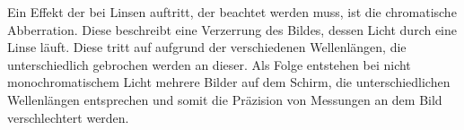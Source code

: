     \noindent Ein Effekt der bei Linsen auftritt, der beachtet werden muss, ist die chromatische Abberration. Diese beschreibt eine Verzerrung des Bildes, dessen Licht durch eine Linse läuft. Diese tritt auf aufgrund der verschiedenen Wellenlängen, die unterschiedlich gebrochen werden an dieser.
    Als Folge entstehen bei nicht monochromatischem Licht mehrere Bilder auf dem Schirm, die unterschiedlichen Wellenlängen entsprechen und somit die Präzision von Messungen an dem Bild verschlechtert werden.



